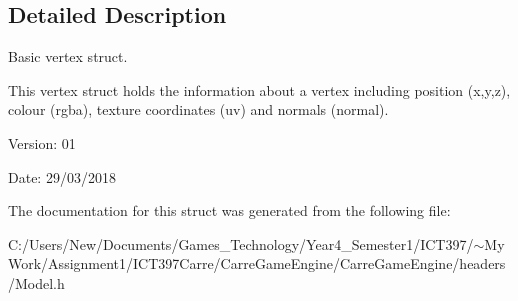 \subsection{Detailed Description}
Basic vertex struct. 

This vertex struct holds the information about a vertex including position (x,y,z), colour (rgba), texture coordinates (uv) and normals (normal).

\begin{Desc}
\item[Version:]01 \end{Desc}
\begin{Desc}
\item[Date:]29/03/2018 \end{Desc}


The documentation for this struct was generated from the following file:\begin{CompactItemize}
\item 
C:/Users/New/Documents/Games\_\-Technology/Year4\_\-Semester1/ICT397/$\sim$My Work/Assignment1/ICT397Carre/CarreGameEngine/CarreGameEngine/headers/Model.h\end{CompactItemize}
